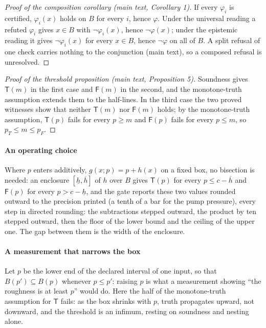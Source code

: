 \documentclass[preprint,11pt,a4paper]{elsarticle}
\theoremstyle{definition}
\newcommand{\Tp}{\mathsf{T}}
\newcommand{\Fp}{\mathsf{F}}
\begin{document}
\begin{proof}[Proof of the composition corollary (main text, Corollary 1)]
If every $\varphi_i$ is certified, $\varphi_i(x)$ holds on $B$ for every $i$, hence $\varphi$. Under the universal reading a refuted $\varphi_i$ gives $x\in B$ with $\neg\varphi_i(x)$, hence $\neg\varphi(x)$; under the epistemic reading it gives $\neg\varphi_i(x)$ for every $x\in B$, hence $\neg\varphi$ on all of $B$. A split refusal of one check carries nothing to the conjunction (main text), so a composed refusal is unresolved.
\end{proof}


\begin{proof}[Proof of the threshold proposition (main text, Proposition 5)]
Soundness gives $\Tp(m)$ in the first case and $\Fp(m)$ in the second, and the monotone-truth assumption extends them to the half-lines. In the third case the two proved witnesses show that neither $\Tp(m)$ nor $\Fp(m)$ holds; by the monotone-truth assumption, $\Tp(p)$ fails for every $p\ge m$ and $\Fp(p)$ fails for every $p\le m$, so $p_T\le m\le p_F$.
\end{proof}

\paragraph{An operating choice}
Where $p$ enters additively, $g(x;p)=p+h(x)$ on a fixed box, no bisection is needed: an enclosure $[\underline h,\overline h]$ of $h$ over $B$ gives $\Tp(p)$ for every $p\le c-\overline h$ and $\Fp(p)$ for every $p>c-\underline h$, and the gate reports these two values rounded outward to the precision printed (a tenth of a bar for the pump pressure), every step in directed rounding: the subtractions stepped outward, the product by ten stepped outward, then the floor of the lower bound and the ceiling of the upper one. The gap between them is the width of the enclosure.

\paragraph{A measurement that narrows the box}
Let $p$ be the lower end of the declared interval of one input, so that $B(p')\subseteq B(p)$ whenever $p\le p'$: raising $p$ is what a measurement showing ``the roughness is at least $p$'' would do. Here the half of the monotone-truth assumption for $\Tp$ fails: as the box shrinks with $p$, truth propagates upward, not downward, and the threshold is an infimum, resting on soundness and nesting alone.
\end{document}
